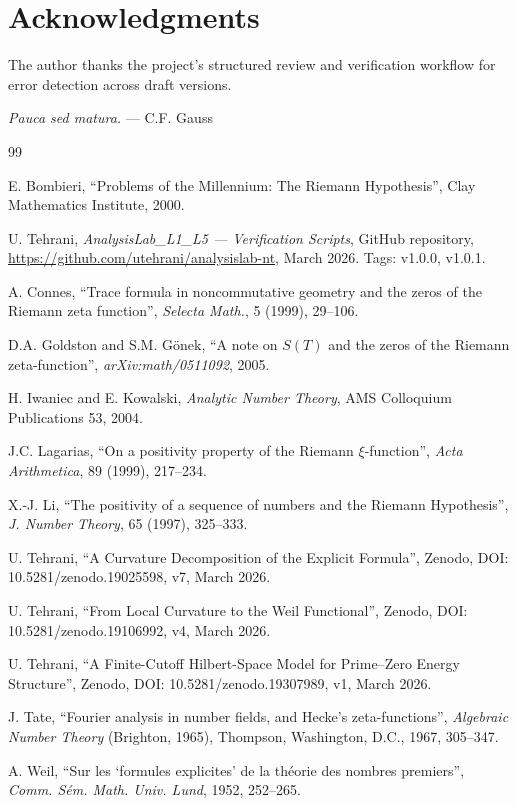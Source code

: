 \documentclass[11pt]{article}
\begin{document}
\section*{Acknowledgments}

The author thanks the project's structured review and verification
workflow for error detection across draft versions.

\emph{Pauca sed matura.} --- C.F. Gauss

\begin{thebibliography}{99}

E. Bombieri, ``Problems of the Millennium: The Riemann Hypothesis'',
Clay Mathematics Institute, 2000.

U. Tehrani, \emph{AnalysisLab\_L1\_L5 --- Verification Scripts},
GitHub repository,
\url{https://github.com/utehrani/analysislab-nt},
March 2026. Tags: v1.0.0, v1.0.1.

A. Connes, ``Trace formula in noncommutative geometry and the zeros
of the Riemann zeta function'',
\emph{Selecta Math.}, 5 (1999), 29--106.

D.A. Goldston and S.M. G\"onek,
``A note on $S(T)$ and the zeros of the Riemann zeta-function'',
\emph{arXiv:math/0511092}, 2005.

H. Iwaniec and E. Kowalski,
\emph{Analytic Number Theory},
AMS Colloquium Publications 53, 2004.

J.C. Lagarias,
``On a positivity property of the Riemann $\xi$-function'',
\emph{Acta Arithmetica}, 89 (1999), 217--234.

X.-J. Li,
``The positivity of a sequence of numbers and the Riemann Hypothesis'',
\emph{J. Number Theory}, 65 (1997), 325--333.

U. Tehrani,
``A Curvature Decomposition of the Explicit Formula'',
Zenodo, DOI: 10.5281/zenodo.19025598, v7, March 2026.

U. Tehrani,
``From Local Curvature to the Weil Functional'',
Zenodo, DOI: 10.5281/zenodo.19106992, v4, March 2026.

U. Tehrani,
``A Finite-Cutoff Hilbert-Space Model for Prime--Zero Energy Structure'',
Zenodo, DOI: 10.5281/zenodo.19307989, v1, March 2026.

J. Tate,
``Fourier analysis in number fields, and Hecke's zeta-functions'',
\emph{Algebraic Number Theory} (Brighton, 1965),
Thompson, Washington, D.C., 1967, 305--347.

A. Weil,
``Sur les `formules explicites' de la th\'eorie des nombres premiers'',
\emph{Comm. S\'em. Math. Univ. Lund}, 1952, 252--265.

\end{thebibliography}
\end{document}
